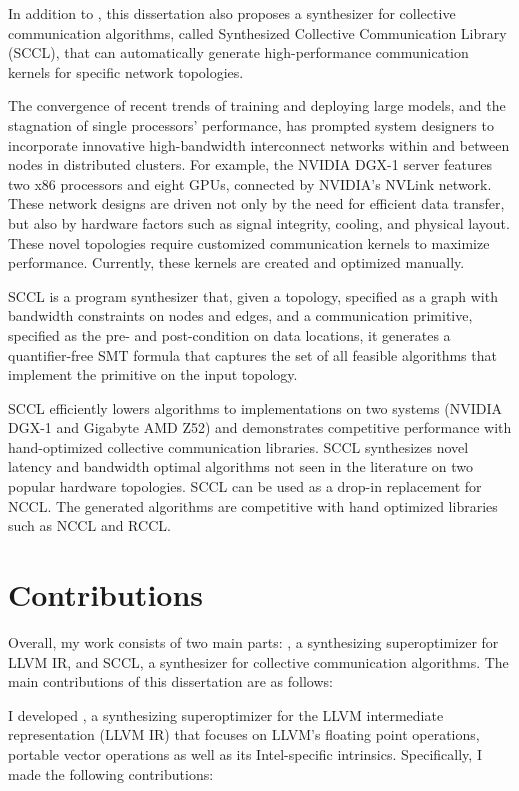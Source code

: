 In addition to \minotaur, this dissertation also proposes a synthesizer
for collective communication algorithms, called Synthesized Collective
Communication Library (SCCL), that can automatically generate
high-performance communication kernels for specific network
topologies.

The convergence of recent trends of training and deploying large
models, and the stagnation of single processors' performance, has
prompted system designers to incorporate innovative high-bandwidth
interconnect networks within and between nodes in distributed
clusters.
%
For example, the NVIDIA DGX-1 server features two x86 processors and
eight GPUs, connected by NVIDIA's NVLink network.
%
These network designs are driven not only by the need for efficient
data transfer, but also by hardware factors such as signal integrity,
cooling, and physical layout.
%
These novel topologies require customized communication kernels to
maximize performance.
%
Currently, these kernels are created and optimized manually.

SCCL is a program synthesizer that, given a topology, specified as a
graph with bandwidth constraints on nodes and edges, and a
communication primitive, specified as the pre- and post-condition on
data locations, it generates a quantifier-free SMT formula that
captures the set of all feasible algorithms that implement the
primitive on the input topology.

SCCL efficiently lowers algorithms to implementations on two systems
(NVIDIA DGX-1 and Gigabyte AMD Z52) and demonstrates competitive
performance with hand-optimized collective communication libraries.
%
SCCL synthesizes novel latency and bandwidth optimal algorithms not
seen in the literature on two popular hardware topologies.
%
SCCL can be used as a drop-in replacement for NCCL.
%
The generated algorithms are competitive with hand optimized libraries
such as NCCL and RCCL.

\section{Contributions}

Overall, my work consists of two main parts: \minotaur, a synthesizing
superoptimizer for LLVM IR, and SCCL, a synthesizer for collective
communication algorithms. The main contributions of this dissertation
are as follows:

I developed \minotaur, a synthesizing superoptimizer for the LLVM
intermediate representation (LLVM IR) that focuses on LLVM's floating
point operations, portable vector operations as well as its
Intel-specific intrinsics. Specifically, I made the following
contributions:

